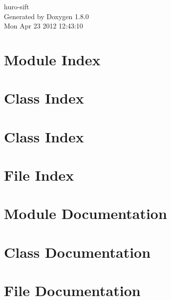 \documentclass{book}
\begin{document}
\hypersetup{pageanchor=false,citecolor=blue}
\begin{titlepage}
\vspace*{7cm}
\begin{center}
{\Large huro-\/sift }\\
\vspace*{1cm}
{\large Generated by Doxygen 1.8.0}\\
\vspace*{0.5cm}
{\small Mon Apr 23 2012 12:43:10}\\
\end{center}
\end{titlepage}
\clearemptydoublepage
{}
\tableofcontents
\clearemptydoublepage
{}
\hypersetup{pageanchor=true,citecolor=blue}
\chapter{Module Index}

\chapter{Class Index}

\chapter{Class Index}

\chapter{File Index}

\chapter{Module Documentation}



\chapter{Class Documentation}









\chapter{File Documentation}



















\printindex
\end{document}
